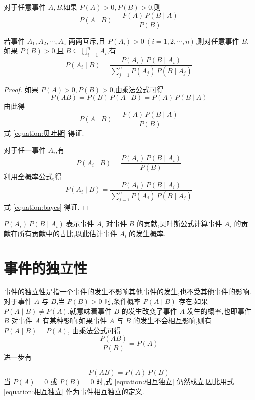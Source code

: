 \begin{theorem}[][贝叶斯公式]
    \indent 对于任意事件 $A,B$,如果 $P(A)>0, P(B)>0$,则
    \begin{equation} \label{equation:贝叶斯}
        P(A \mid B)=\dfrac{P(A) \, P(B \mid A)}{P(B)}
    \end{equation}

    若事件 $A_1,A_2,\cdots,A_n$ 两两互斥,且 $P(A_i)>0 \ (i=1,2,\cdots,n)$,则对任意事件 $B$,如果 $P(B)>0$,且 $B \subseteq \displaystyle\bigcup_{i=1}^n A_i$,有
    \begin{equation} \label{equation:bayes}
        P(A_i \mid B) = \dfrac{P(A_i) \, P(B \mid A_i)}{\displaystyle\sum_{j=1}^n P(A_j) \, P(B \mid A_j)}
    \end{equation}
\end{theorem}

\begin{proof}
    如果 $P(A)>0, P(B)>0$,由乘法公式可得
    $$
    P(AB) = P(B) \, P(A \mid B) = P(A) \, P(B \mid A)
    $$
    由此得
    $$
    P(A \mid B)=\dfrac{P(A) \, P(B \mid A)}{P(B)}
    $$
    式 \eqref{equation:贝叶斯} 得证.

    对于任一事件 $A_i$,有
    $$
    P(A_i \mid B)=\dfrac{P(A_i) \, P(B \mid A_i)}{P(B)}
    $$
    利用全概率公式,得
    $$
    P(A_i \mid B) = \dfrac{P(A_i) \, P(B \mid A_i)}{\displaystyle\sum_{j=1}^n P(A_j) \, P(B \mid A_j)}
    $$
    式 \eqref{equation:bayes} 得证.
\end{proof}

\begin{note}
    \indent $P(A_i) \, P(B \mid A_i)$ 表示事件 $A_i$ 对事件 $B$ 的贡献,贝叶斯公式计算事件 $A_i$ 的贡献在所有贡献中的占比,以此估计事件 $A_i$ 的发生概率.
\end{note}

\section{事件的独立性}

事件的独立性是指一个事件的发生不影响其他事件的发生,也不受其他事件的影响.对于事件 $A$ 与 $B$,当 $P(B) > 0$ 时,条件概率 $P(A \mid B)$ 存在.如果 $P(A \mid B) \not= P(A)$,就意味着事件 $B$ 的发生改变了事件 $A$ 发生的概率,也即事件 $B$ 对事件 $A$ 有某种影响.如果事件 $A$ 与 $B$ 的发生不会相互影响,则有 $P(A \mid B) = P(A)$, 由乘法公式可得
$$
\dfrac{P(AB)}{P(B)} = P(A)
$$
进一步有

\begin{equation} \label{equation:相互独立}
    P(AB) = P(A) \, P(B)
\end{equation}
当 $P(A)=0$ 或 $P(B)=0$ 时,式 \eqref{equation:相互独立} 仍然成立,因此用式 \eqref{equation:相互独立} 作为事件相互独立的定义.

